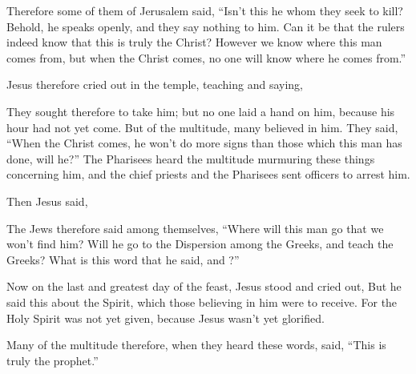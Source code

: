 {{{}}
\par }{\PP {}Therefore some of them of Jerusalem said, “Isn’t this he whom they seek to kill?
Behold, he speaks openly, and they say nothing to him. Can it be that the rulers indeed know that this is truly the Christ?
However we know where this man comes from, but when the Christ comes, no one will know where he comes from.”
\par }{\PP {}Jesus therefore cried out in the temple, teaching and saying,
{}
\par }{\PP {}They sought therefore to take him; but no one laid a hand on him, because his hour had not yet come.
But of the multitude, many believed in him. They said, “When the Christ comes, he won’t do more signs than those which this man has done, will he?”
The Pharisees heard the multitude murmuring these things concerning him, and the chief priests and the Pharisees sent officers to arrest him.
\par }{\PP {}Then Jesus said,
{}
\par }{\PP {}The Jews therefore said among themselves, “Where will this man go that we won’t find him? Will he go to the Dispersion among the Greeks, and teach the Greeks?
What is this word that he said,
{} and
{}?”
\par }{\PP {}Now on the last and greatest day of the feast, Jesus stood and cried out,
{}
But he said this about the Spirit, which those believing in him were to receive. For the Holy Spirit was not yet given, because Jesus wasn’t yet glorified.
\par }{\PP {}Many of the multitude therefore, when they heard these words, said, “This is truly the prophet.”
}
